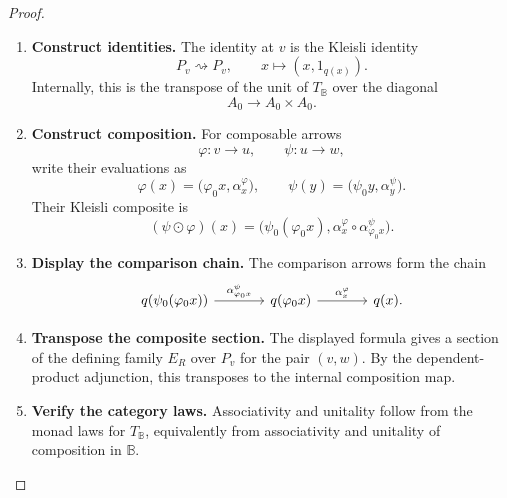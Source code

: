 \begin{proof}
    \leavevmode
    \begin{enumerate}
        \item \textbf{Construct identities.}
        The identity at \(v\) is the Kleisli identity
        \[
            P_v\rightsquigarrow P_v,
            \qquad
            x\longmapsto (x,1_{q(x)}).
        \]
        Internally, this is the transpose of the unit of \(T_{\mathbb B}\) over
        the diagonal
        \[
            A_0\to A_0\times A_0.
        \]

        \item \textbf{Construct composition.}
        For composable arrows
        \[
            \varphi:v\to u,
            \qquad
            \psi:u\to w,
        \]
        write their evaluations as
        \[
            \varphi(x)=\bigl(\varphi_0x,\alpha^\varphi_x\bigr),
            \qquad
            \psi(y)=\bigl(\psi_0y,\alpha^\psi_y\bigr).
        \]
        Their Kleisli composite is
        \[
            (\psi\odot\varphi)(x)
            =
            \bigl(
                \psi_0(\varphi_0x),
                \alpha^\varphi_x\circ\alpha^\psi_{\varphi_0x}
            \bigr).
        \]

        \item \textbf{Display the comparison chain.}
        The comparison arrows form the chain
        \[
        \begin{tikzcd}[column sep=large, row sep=large]
            q(\psi_0(\varphi_0x))
                \arrow[r, "{\alpha^\psi_{\varphi_0x}}"]
            &
            q(\varphi_0x)
                \arrow[r, "{\alpha^\varphi_x}"]
            &
            q(x).
        \end{tikzcd}
        \]

        \item \textbf{Transpose the composite section.}
        The displayed formula gives a section of the defining family \(E_R\)
        over \(P_v\) for the pair \((v,w)\). By the dependent-product
        adjunction, this transposes to the internal composition map.

        \item \textbf{Verify the category laws.}
        Associativity and unitality follow from the monad laws for
        \(T_{\mathbb B}\), equivalently from associativity and unitality of
        composition in \(\mathbb B\).
    \end{enumerate}
\end{proof}

